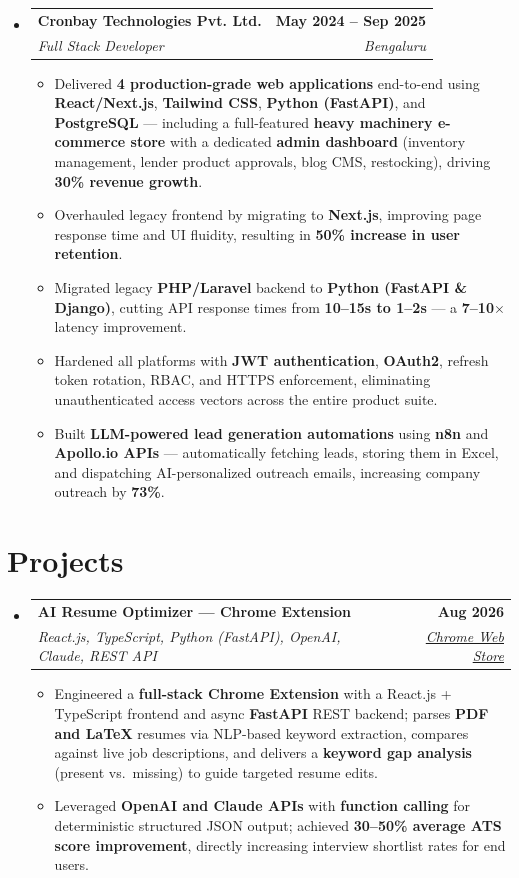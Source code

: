 \documentclass[letterpaper,11pt]{article}
\makeatletter
\newcommand{\resumeItem}[1]{\item\small{#1}}
\newcommand{\resumeSubheading}[4]{
\item
\begin{tabular*}{\textwidth}{l@{\extracolsep{\fill}}r}
\textbf{#1} & \textbf{\small #2}\\
\textit{\small #3} & \textit{\small #4}
\end{tabular*}\vspace{1pt}
}
\makeatother
\begin{document}
\begin{itemize}[leftmargin=0in,label={},topsep=3pt,itemsep=4pt]
\resumeSubheading{Cronbay Technologies Pvt. Ltd.}{May 2024 -- Sep 2025}{Full Stack Developer}{Bengaluru}
\begin{itemize}[leftmargin=0.18in,topsep=3pt,itemsep=2pt,parsep=0pt]
  \resumeItem{Delivered \textbf{4 production-grade web applications} end-to-end using \textbf{React/Next.js}, \textbf{Tailwind CSS}, \textbf{Python (FastAPI)}, and \textbf{PostgreSQL} --- including a full-featured \textbf{heavy machinery e-commerce store} with a dedicated \textbf{admin dashboard} (inventory management, lender product approvals, blog CMS, restocking), driving \textbf{30\% revenue growth}.}
  \resumeItem{Overhauled legacy frontend by migrating to \textbf{Next.js}, improving page response time and UI fluidity, resulting in \textbf{50\% increase in user retention}.}
  \resumeItem{Migrated legacy \textbf{PHP/Laravel} backend to \textbf{Python (FastAPI \& Django)}, cutting API response times from \textbf{10--15s to 1--2s} --- a \textbf{7--10$\times$} latency improvement.}
  \resumeItem{Hardened all platforms with \textbf{JWT authentication}, \textbf{OAuth2}, refresh token rotation, RBAC, and HTTPS enforcement, eliminating unauthenticated access vectors across the entire product suite.}
  \resumeItem{Built \textbf{LLM-powered lead generation automations} using \textbf{n8n} and \textbf{Apollo.io APIs} --- automatically fetching leads, storing them in Excel, and dispatching AI-personalized outreach emails, increasing company outreach by \textbf{73\%}.}
\end{itemize}

\end{itemize}

\section*{Projects}
\begin{itemize}[leftmargin=0in,label={},topsep=3pt,itemsep=4pt]

\resumeSubheading{AI Resume Optimizer --- Chrome Extension}{Aug 2026}{React.js, TypeScript, Python (FastAPI), OpenAI, Claude, REST API}{\href{https://chromewebstore.google.com/detail/resume-optimizer/meomiokepgpjdgifadlogdkednkglkkb?pli=1}{Chrome Web Store}}
\begin{itemize}[leftmargin=0.18in,topsep=3pt,itemsep=2pt,parsep=0pt]
  \resumeItem{Engineered a \textbf{full-stack Chrome Extension} with a React.js + TypeScript frontend and async \textbf{FastAPI} REST backend; parses \textbf{PDF and LaTeX} resumes via NLP-based keyword extraction, compares against live job descriptions, and delivers a \textbf{keyword gap analysis} (present vs.\ missing) to guide targeted resume edits.}
  \resumeItem{Leveraged \textbf{OpenAI and Claude APIs} with \textbf{function calling} for deterministic structured JSON output; achieved \textbf{30--50\% average ATS score improvement}, directly increasing interview shortlist rates for end users.}
\end{itemize}

\end{itemize}
\end{document}
